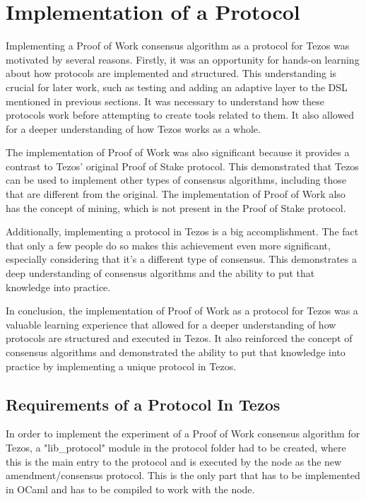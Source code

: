 \section{Implementation of a Protocol}

Implementing a Proof of Work consensus algorithm as a protocol for Tezos was motivated by several reasons. Firstly, it was an opportunity for hands-on learning about how protocols are implemented and structured. This understanding is crucial for later work, such as testing and adding an adaptive layer to the DSL mentioned in previous sections. It was necessary to understand how these protocols work before attempting to create tools related to them.
It also allowed for a deeper understanding of how Tezos works as a whole.

The implementation of Proof of Work was also significant because it provides a contrast to Tezos' original Proof of Stake protocol. This demonstrated that Tezos can be used to implement other types of consensus algorithms, including those that are different from the original. The implementation of Proof of Work also has the concept of mining, which is not present in the Proof of Stake protocol.


Additionally, implementing a protocol in Tezos is a big accomplishment. The fact that only a few people do so makes this achievement even more significant, especially considering that it's a different type of consensus. This demonstrates a deep understanding of consensus algorithms and the ability to put that knowledge into practice.



In conclusion, the implementation of Proof of Work as a protocol for Tezos was a valuable learning experience that allowed for a deeper understanding of how protocols are structured and executed in Tezos. It also reinforced the concept of consensus algorithms and demonstrated the ability to put that knowledge into practice by implementing a unique protocol in Tezos.


\subsection*{Requirements of a Protocol In Tezos}
In order to implement the experiment of a Proof of Work consensus algorithm for Tezos, a "lib\_protocol" module in the protocol folder had to be created, where this is the main entry to the protocol and is executed by the node as the new amendment/consensus protocol. This is the only part that has to be implemented in OCaml and has to be compiled to work with the node.

